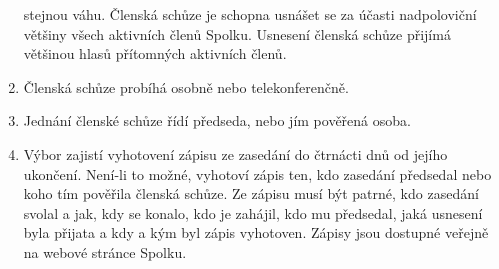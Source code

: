 \documentclass[11pt,a4paper]{article}
\begin{document}
\begin{enumerate}[itemsep=0pt]
    stejnou váhu. Členská schůze je schopna usnášet se za účasti nadpoloviční 
    většiny všech aktivních členů Spolku. Usnesení členská schůze přijímá 
    většinou hlasů přítomných aktivních členů. 
    \item Členská schůze probíhá osobně nebo telekonferenčně.
    \item Jednání členské schůze řídí předseda, nebo jím pověřená osoba.
    \item Výbor zajistí vyhotovení zápisu ze zasedání do čtrnácti dnů od jejího 
    ukončení. Není-li to možné, vyhotoví zápis ten, kdo zasedání předsedal nebo 
    koho tím pověřila členská schůze. Ze zápisu musí být patrné, kdo zasedání 
    svolal a jak, kdy se konalo, kdo je zahájil, kdo mu předsedal, jaká usnesení
    byla přijata a kdy a kým byl zápis vyhotoven. Zápisy jsou dostupné veřejně 
    na webové stránce Spolku.
\end{enumerate}
\end{document}
